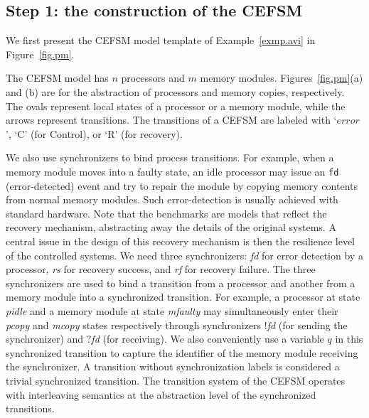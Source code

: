 \documentclass[times,10pt,twocolumn]{article}
\newcommand{\emerr}{\textit{error}}
\begin{document}
\subsection*{Step 1: the construction of the CEFSM}
We first present the CEFSM model template 
of Example~\ref{exmp.avi} in Figure~\ref{fig.pm}. 
\begin{figure*}[t] 
\begin{center} 
\caption{CEFSM templates of $n$ processors and $m$ memory copies}
\label{fig.pm}
\end{center} 
\end{figure*}
The CEFSM model has $n$ processors and $m$ memory modules. 
Figures~\ref{fig.pm}(a) and (b) are 
for the abstraction of processors and memory copies, respectively.  
The ovals represent local states of a processor or a 
memory module, while the arrows represent transitions. 
The transitions of a CEFSM are labeled with `$\emerr$', 
`C' (for Control), or `R' (for recovery).  

We also use synchronizers to bind process transitions. 
For example, when a memory module moves into a faulty state, 
an idle processor may issue an {\tt fd} (error-detected) event
and try to repair the module by copying memory contents from 
normal memory modules.  
Such error-detection is usually achieved with standard hardware.  
Note that the benchmarks are models that reflect the 
recovery mechanism, abstracting away the details of the original systems.  
A central issue in the design of this recovery mechanism is then 
the resilience level of the controlled systems.  
We need three synchronizers: 
\textit{fd} for error detection by a processor, 
\textit{rs} for recovery success, 
and \textit{rf} for recovery failure.  
The three synchronizers are used to bind a transition from a processor 
and another from a memory module into a synchronized transition.  
For example, a processor at state \textit{pidle} and 
a memory module at state 
\textit{mfaulty} may simultaneously enter their 
\textit{pcopy} and \textit{mcopy} states respectively
through synchronizers $!$\textit{fd} (for sending the synchronizer) 
and $?$\textit{fd} (for receiving). 
We also conveniently use a variable $q$ in this synchronized 
transition to capture the identifier of the memory module receiving 
the synchronizer.  
A transition without synchronization labels is considered a trivial 
synchronized transition.  
The transition system of the CEFSM operates with interleaving semantics 
at the abstraction level of the synchronized transitions. 
\end{document}
